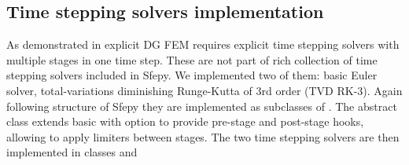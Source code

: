 \subsection{Time stepping solvers implementation}
As demonstrated in  explicit DG FEM requires explicit 
time 
stepping solvers with multiple stages in one time step. These are not part of 
rich collection of time stepping solvers included in Sfepy. We implemented 
two of them: basic Euler solver, total-variations diminishing Runge-Kutta 
of 3rd order (TVD RK-3). 
Again following 
structure of Sfepy they are implemented as subclasses of 
. The abstract class  
extends basic  with option to provide pre-stage and 
post-stage hooks, allowing to apply limiters between stages. The two time stepping 
solvers are then implemented in classes  and 

